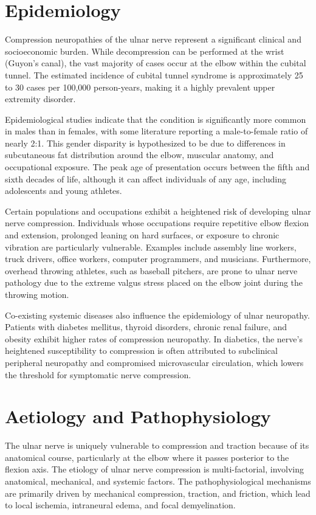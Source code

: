 \section*{Epidemiology}
Compression neuropathies of the ulnar nerve represent a significant clinical and socioeconomic burden. While decompression can be performed at the wrist (Guyon's canal), the vast majority of cases occur at the elbow within the cubital tunnel. The estimated incidence of cubital tunnel syndrome is approximately 25 to 30 cases per 100,000 person-years, making it a highly prevalent upper extremity disorder.

Epidemiological studies indicate that the condition is significantly more common in males than in females, with some literature reporting a male-to-female ratio of nearly 2:1. This gender disparity is hypothesized to be due to differences in subcutaneous fat distribution around the elbow, muscular anatomy, and occupational exposure. The peak age of presentation occurs between the fifth and sixth decades of life, although it can affect individuals of any age, including adolescents and young athletes.

Certain populations and occupations exhibit a heightened risk of developing ulnar nerve compression. Individuals whose occupations require repetitive elbow flexion and extension, prolonged leaning on hard surfaces, or exposure to chronic vibration are particularly vulnerable. Examples include assembly line workers, truck drivers, office workers, computer programmers, and musicians. Furthermore, overhead throwing athletes, such as baseball pitchers, are prone to ulnar nerve pathology due to the extreme valgus stress placed on the elbow joint during the throwing motion.

Co-existing systemic diseases also influence the epidemiology of ulnar neuropathy. Patients with diabetes mellitus, thyroid disorders, chronic renal failure, and obesity exhibit higher rates of compression neuropathy. In diabetics, the nerve's heightened susceptibility to compression is often attributed to subclinical peripheral neuropathy and compromised microvascular circulation, which lowers the threshold for symptomatic nerve compression.

\section*{Aetiology and Pathophysiology}
The ulnar nerve is uniquely vulnerable to compression and traction because of its anatomical course, particularly at the elbow where it passes posterior to the flexion axis. The etiology of ulnar nerve compression is multi-factorial, involving anatomical, mechanical, and systemic factors. The pathophysiological mechanisms are primarily driven by mechanical compression, traction, and friction, which lead to local ischemia, intraneural edema, and focal demyelination.

